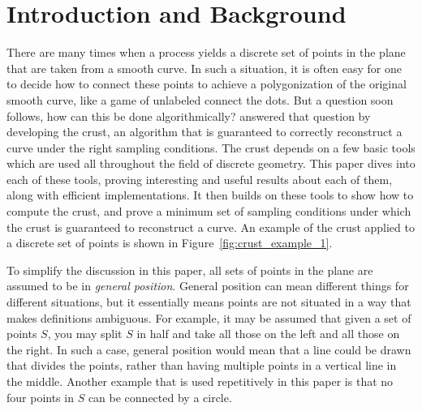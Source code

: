 \section{Introduction and Background}

There are many times when a process yields a discrete set of points in the plane that are taken from a smooth curve.
In such a situation, it is often easy for one to decide how to connect these points to achieve a polygonization of the original smooth curve, like a game of unlabeled connect the dots.
But a question soon follows, how can this be done algorithmically?
\citet{crust} answered that question by developing the crust, an algorithm that is guaranteed to correctly reconstruct a curve under the right sampling conditions.
The crust depends on a few basic tools which are used all throughout the field of discrete geometry.
This paper dives into each of these tools, proving interesting and useful results about each of them, along with efficient implementations.
It then builds on these tools to show how to compute the crust, and prove a minimum set of sampling conditions under which the crust is guaranteed to reconstruct a curve.
An example of the crust applied to a discrete set of points is shown in Figure~\ref{fig:crust_example_1}.



To simplify the discussion in this paper, all sets of points in the plane are assumed to be in \textit{general position}.
General position can mean different things for different situations, but it essentially means points are not situated in a way that makes definitions ambiguous.
For example, it may be assumed that given a set of points $S$, you may split $S$ in half and take all those on the left and all those on the right.
In such a case, general position would mean that a line could be drawn that divides the points, rather than having multiple points in a vertical line in the middle.
Another example that is used repetitively in this paper is that no four points in $S$ can be connected by a circle.

